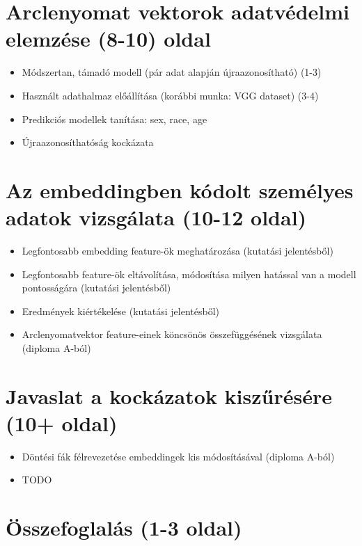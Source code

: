 \section{Arclenyomat vektorok adatvédelmi elemzése (8-10) oldal}
\begin{itemize}
	\item Módszertan, támadó modell (pár adat alapján újraazonosítható) (1-3) 
	\item Használt adathalmaz előállítása (korábbi munka:
	VGG dataset) (3-4)
	\item Predikciós modellek tanítása: sex, race, age 
	\item Újraazonosíthatóság kockázata
\end{itemize}

\section{Az embeddingben kódolt személyes adatok vizsgálata (10-12 oldal)}
\begin{itemize}
	\item Legfontosabb embedding feature-ök meghatározása (kutatási jelentésből)
	\item Legfontosabb feature-ök eltávolítása, módosítása milyen hatással van a modell pontosságára (kutatási jelentésből) 
	\item Eredmények kiértékelése (kutatási jelentésből) 
	\item Arclenyomatvektor feature-einek köncsönös összefüggésének vizsgálata (diploma A-ból)
\end{itemize}


\section{Javaslat a kockázatok kiszűrésére (10+ oldal)}
\begin{itemize}
	\item Döntési fák félrevezetése embeddingek kis módosításával (diploma A-ból)
	\item TODO
\end{itemize}

\section{Összefoglalás (1-3 oldal)}
